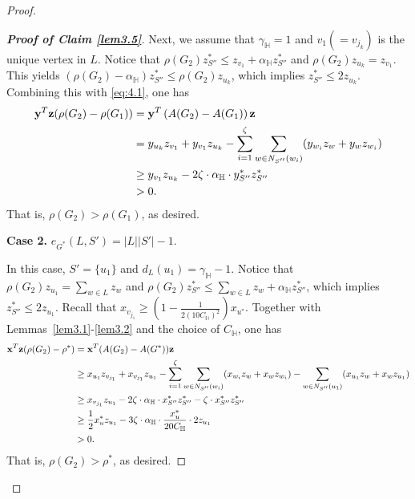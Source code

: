 \documentclass[11pt, a4paper]{article}
\theoremstyle{definition}
\newcommand{\<}{\subseteq}
\begin{document}
\begin{proof}
\begin{proof}[\bf Proof of Claim \ref{lem3.5}]
    Next, we assume that $\gamma_\mathbb{H}=1$ and $v_1 (=v_{j_k})$ is the unique vertex in $L$.
    Notice that $\rho(G_2)z_{S''}^*\leq z_{v_1}+\alpha_\mathbb{H}z_{S''}^*$ %
    and $\rho(G_2)z_{u_k}=z_{v_1}$. 
    This yields $(\rho(G_2)-\alpha_\mathbb{H})z_{S''}^*\leq \rho(G_2)z_{u_k}$, %
    which implies $z_{S''}^*\leq 2z_{u_k}$. Combining this with \eqref{eq:4.1}, one has 
    \begin{align*}
        {\bf y}^T{\bf z}(\rho(G_2)-\rho(G_1))&={\bf y}^T\left(A(G_2)-A(G_1)\right){\bf z}\\
        &=y_{u_k}z_{v_1}+y_{v_1}z_{u_k}-\sum_{i=1}^{\zeta}\sum_{w\in N_{S''}(w_i)}(y_{w_i}z_w+y_wz_{w_i})\\&\geq y_{v_1}z_{u_k}-2\zeta\cdot\alpha_\mathbb{H}\cdot y_{S''}^*z_{S''}^*\\&>0.%
    \end{align*}
That is, $\rho(G_2)>\rho(G_1)$, as desired. 

{\bf Case 2.} $e_{G^*}(L,S')=|L||S'|-1$.

In this case, $S'=\{u_1\}$ and $d_L(u_1)=\gamma_\mathbb{H}-1$. 
    Notice that $\rho(G_2)z_{u_1}=\sum_{w\in L}z_w$ and $\rho(G_2)z_{S''}^*\leq\sum_{w\in L}z_w+\alpha_\mathbb{H}z_{S''}^*$, %
    which implies $z_{S''}^*\leq 2z_{u_1}$. Recall that $x_{v_{j_1}} \geq \left(1-\frac{1}{2(10C_\mathbb{H})^{2}}\right)x_{u^{*}}$.  Together with Lemmas~\ref{lem3.1}-\ref{lem3.2} and the choice of $C_\mathbb{H}$, one has
    \begin{align*}
        {\bf x}^T{\bf z}(\rho(G_2)-\rho^*)&={\bf x}^T(A(G_2)-A(G^*)){\bf z} \\&\geq x_{u_1}z_{v_{j_1}}+x_{v_{j_1}}z_{u_1}-\sum_{i=1}^{\zeta}\sum_{w\in N_{S''}(w_i)}(x_{w_i}z_w+x_wz_{w_i})-\sum_{w\in N_{S''}(u_1)}(x_{u_1}z_w+x_wz_{u_1})\\ &\geq x_{v_{j_1}}z_{u_1}-2\zeta\cdot \alpha_\mathbb{H}\cdot x_{S''}^*z_{S''}^*-\zeta \cdot x_{S''}^*z_{S''}^*\\ &\geq \frac{1}{2}x_u^*z_{u_1}-3\zeta\cdot  \alpha_\mathbb{H}\cdot\frac{x_u^*}{20C_\mathbb{H}}\cdot2z_{u_1}\\ &>0.
    \end{align*}
That is, $\rho(G_2)>\rho^*$, as desired. 
\end{proof}


\end{proof}
\end{document}
